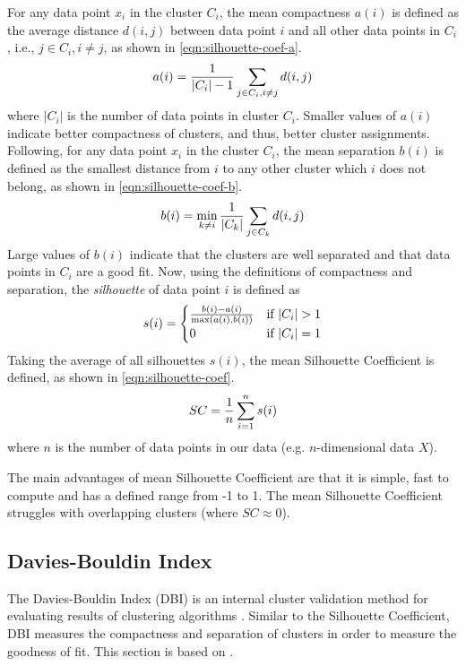 For any data point $x_i$ in the cluster $C_i$, the mean compactness $a(i)$ is defined as the average distance $d(i, j)$ between data point $i$ and all other data points in $C_i$, i.e., $j \in C_i, i \neq j$, as shown in \cref{eqn:silhouette-coef-a}.
\begin{align}
    a(i) = \frac{1}{|C_i| - 1} \sum\limits_{j \in C_i, i \neq j}^{}{d(i, j)}
    \label{eqn:silhouette-coef-a}
\end{align}
where $|C_i|$ is the number of data points in cluster $C_i$. Smaller values of $a(i)$ indicate better compactness of clusters, and thus, better cluster assignments. Following, for any data point $x_i$ in the cluster $C_i$, the mean separation $b(i)$ is defined as the smallest distance from $i$ to any other cluster which $i$ does not belong, as shown in \cref{eqn:silhouette-coef-b}.
\begin{align}
    b(i) = \min_{k \neq i} \frac{1}{|C_k|} \sum\limits_{j \in C_k}^{}{d(i, j)}
    \label{eqn:silhouette-coef-b}
\end{align}
Large values of $b(i)$ indicate that the clusters are well separated and that data points in $C_i$ are a good fit. Now, using the definitions of compactness and separation, the \textit{silhouette} of data point $i$ is defined as
\begin{align}
    s(i) = \begin{cases}
        \frac{b(i) - a(i)}{\max \left(a(i), b(i)\right)} & \mbox{if } |C_i| > 1 \\
        0 & \mbox{if } |C_i| = 1
    \end{cases}
\end{align}
Taking the average of all silhouettes $s(i)$, the mean Silhouette Coefficient is defined, as shown in \cref{eqn:silhouette-coef}.
\begin{align}
    SC = \frac{1}{n} \sum\limits_{i=1}^{n}{s(i)}
    \label{eqn:silhouette-coef}
\end{align}
where $n$ is the number of data points in our data (e.g. $n$-dimensional data $X$).

The main advantages of mean Silhouette Coefficient are that it is simple, fast to compute and has a defined range from -1 to 1. The mean Silhouette Coefficient struggles with overlapping clusters (where $SC \approx 0$).

\subsection{Davies-Bouldin Index}
\label{sec:davies-bouldin-index}
The Davies-Bouldin Index (DBI) is an internal cluster validation method for evaluating results of clustering algorithms \cite{DaviesBouldin1979}. Similar to the Silhouette Coefficient, DBI measures the compactness and separation of clusters in order to measure the goodness of fit. This section is based on \cite{DaviesBouldin1979}.

